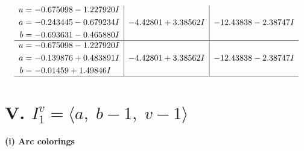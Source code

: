 \documentclass[1p]{elsarticle_modified}
\theoremstyle{definition}
\begin{document}
$$\begin{array}{c|c|c}
\begin{aligned}
u &= -0.675098 - 1.227920 I \\
a &= -0.243445 - 0.679234 I \\
b &= -0.693631 - 0.465880 I\end{aligned}
 & -4.42801 + 3.38562 I & -12.43838 - 2.38747 I \\ \hline\begin{aligned}
u &= -0.675098 - 1.227920 I \\
a &= -0.139876 + 0.483891 I \\
b &= -0.01459 + 1.49846 I\end{aligned}
 & -4.42801 + 3.38562 I & -12.43838 - 2.38747 I\\
 \hline 
 \end{array}$$\newpage\newpage\renewcommand{\arraystretch}{1}
\centering \section*{V. $I^v_{1}= \langle a,\;b-1,\;v-1 \rangle$}
\flushleft \textbf{(i) Arc colorings}\\
\end{document}

